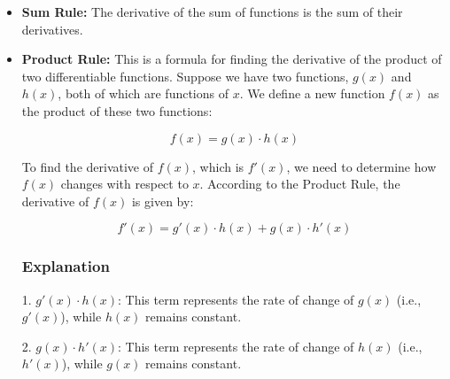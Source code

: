\begin{itemize}
    \item \textbf{Sum Rule:} The derivative of the sum of functions is the sum of their derivatives.
    \begin{center}
    \end{center}

    \item \textbf{Product Rule:} This is a formula for finding the derivative of the product of two differentiable functions. Suppose we have two functions, \( g(x) \) and \( h(x) \), both of which are functions of \( x \). We define a new function \( f(x) \) as the product of these two functions:

    \[
    f(x) = g(x) \cdot h(x)
    \]
    
    To find the derivative of \( f(x) \), which is \( f'(x) \), we need to determine how \( f(x) \) changes with respect to \( x \). According to the Product Rule, the derivative of \( f(x) \) is given by:
    
    \[
    f'(x) = g'(x) \cdot h(x) + g(x) \cdot h'(x)
    \]
    
    \subsubsection{Explanation}
    
    1. \( g'(x) \cdot h(x) \): This term represents the rate of change of \( g(x) \) (i.e., \( g'(x) \)), while \( h(x) \) remains constant.
       
    2. \( g(x) \cdot h'(x) \): This term represents the rate of change of \( h(x) \) (i.e., \( h'(x) \)), while \( g(x) \) remains constant.
    

\end{itemize}
